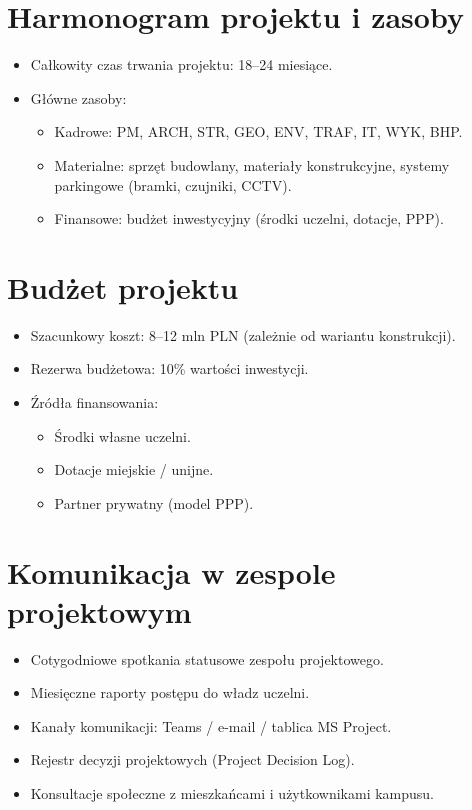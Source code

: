 \documentclass[a4paper,12pt]{article}
\begin{document}
\section{Harmonogram projektu i zasoby}
\begin{itemize}
    \item Całkowity czas trwania projektu: 18–24 miesiące.
    \item Główne zasoby:
    \begin{itemize}
        \item Kadrowe: PM, ARCH, STR, GEO, ENV, TRAF, IT, WYK, BHP.
        \item Materialne: sprzęt budowlany, materiały konstrukcyjne, systemy parkingowe (bramki, czujniki, CCTV).
        \item Finansowe: budżet inwestycyjny (środki uczelni, dotacje, PPP).
    \end{itemize}
\end{itemize}

\section{Budżet projektu}
\begin{itemize}
    \item Szacunkowy koszt: 8–12 mln PLN (zależnie od wariantu konstrukcji).
    \item Rezerwa budżetowa: 10\% wartości inwestycji.
    \item Źródła finansowania:
    \begin{itemize}
        \item Środki własne uczelni.
        \item Dotacje miejskie / unijne.
        \item Partner prywatny (model PPP).
    \end{itemize}
\end{itemize}

\section{Komunikacja w zespole projektowym}
\begin{itemize}
    \item Cotygodniowe spotkania statusowe zespołu projektowego.
    \item Miesięczne raporty postępu do władz uczelni.
    \item Kanały komunikacji: Teams / e-mail / tablica MS Project.
    \item Rejestr decyzji projektowych (Project Decision Log).
    \item Konsultacje społeczne z mieszkańcami i użytkownikami kampusu.
\end{itemize}
\end{document}
